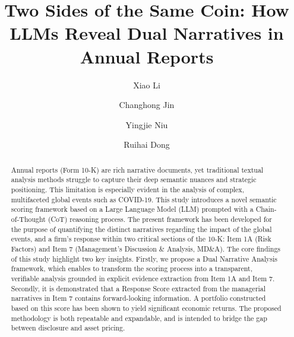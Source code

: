 \documentclass[sigconf]{acmart}
\begin{document}
\title{Two Sides of the Same Coin: How LLMs Reveal Dual Narratives in Annual Reports}

\author{Xiao Li}

\author{Changhong Jin}
\authornotemark[1]

\author{Yingjie Niu}

\author{Ruihai Dong}

\renewcommand{\shortauthors}{Xiao Li, Changhong Jin, Yingjie Niu, and Ruihai Dong}

\begin{abstract}
   Annual reports (Form 10-K) are rich narrative documents, yet traditional textual analysis methods struggle to capture their deep semantic nuances and strategic positioning. This limitation is especially evident in the analysis of complex, multifaceted global events such as COVID-19. This study introduces a novel semantic scoring framework based on a Large Language Model (LLM) prompted with a Chain-of-Thought (CoT) reasoning process. The present framework has been developed for the purpose of quantifying the distinct narratives regarding the impact of the global events, and a firm's response within two critical sections of the 10-K: Item 1A (Risk Factors) and Item 7 (Management's Discussion \& Analysis, MD\&A). The core findings of this study highlight two key insights. Firstly, we propose a Dual Narrative Analysis framework, which enables to transform the scoring process into a transparent, verifiable analysis grounded in explicit evidence extraction from Item 1A and Item 7. Secondly, it is demonstrated that a Response Score extracted from the managerial narratives in Item 7 contains forward-looking information. A portfolio constructed based on this score has been shown to yield significant economic returns. The proposed methodology is both repeatable and expandable, and is intended to bridge the gap between disclosure and asset pricing.
\end{abstract}
\end{document}
